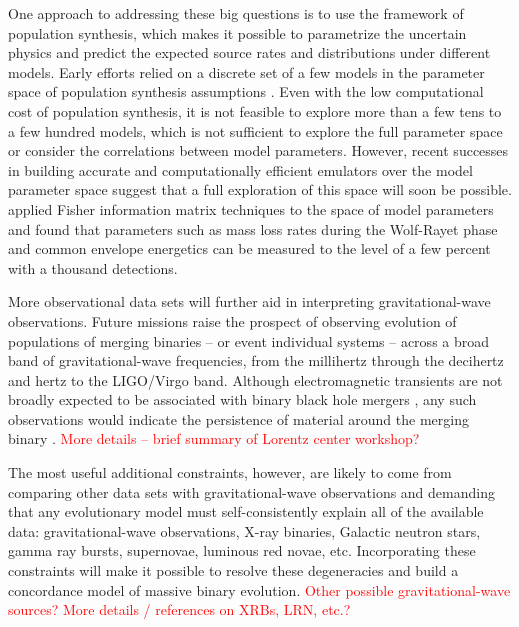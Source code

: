 \documentclass[iop,onecolumn]{revtex4}
\newcommand{\todo}[1]{\textcolor{red}{#1}}
\begin{document}
One approach to addressing these big questions is to use the framework of population synthesis, which makes it possible to parametrize the uncertain physics and predict the expected source rates and distributions under different models.  Early  efforts relied on a discrete set of a few models in the parameter space of population synthesis assumptions \citep{Dominik:2012,Stevenson:2015}.  Even with the low computational cost of population synthesis, it is not feasible to explore more than a few tens to a few hundred models, which is not sufficient to explore the full parameter space or consider the correlations between model parameters.  However, recent successes in building accurate and computationally efficient emulators over the model parameter space \citep{Barrett:2017} suggest that a full exploration of this space will soon be possible. \citet{Barrett:2017FIM} applied Fisher information matrix techniques to the space of model parameters and found that parameters such as mass loss rates during the Wolf-Rayet phase and common envelope energetics can be measured to the level of a few percent with a thousand detections. 

More observational data sets will further aid in interpreting gravitational-wave observations.  Future missions raise the prospect of observing evolution of populations of merging binaries -- or event individual systems -- across a broad band of gravitational-wave frequencies, from the millihertz \citep[e.g.,[]{Sesana:2016} through the decihertz \citep{Mandel:2017} and hertz \citep{ET:2012} to the LIGO/Virgo band.  Although electromagnetic transients are not broadly expected to be associated with binary black hole mergers \citep[e.g.,][]{Lyutikov:2016}, any such observations would indicate the persistence of material around the merging binary \citep[e.g.,][]{deMinkKing:2017}.  \todo{More details -- brief summary of Lorentz center workshop?}

The most useful additional constraints, however, are likely to come from comparing other data sets with gravitational-wave observations and demanding that any evolutionary model must self-consistently explain all of the available data: gravitational-wave observations, X-ray binaries, Galactic neutron stars, gamma ray bursts, supernovae, luminous red novae, etc.   Incorporating these constraints will make it possible to resolve these degeneracies and build a concordance model of massive binary evolution.  \todo{Other possible gravitational-wave sources? More details / references on XRBs, LRN, etc.?}
\end{document}
